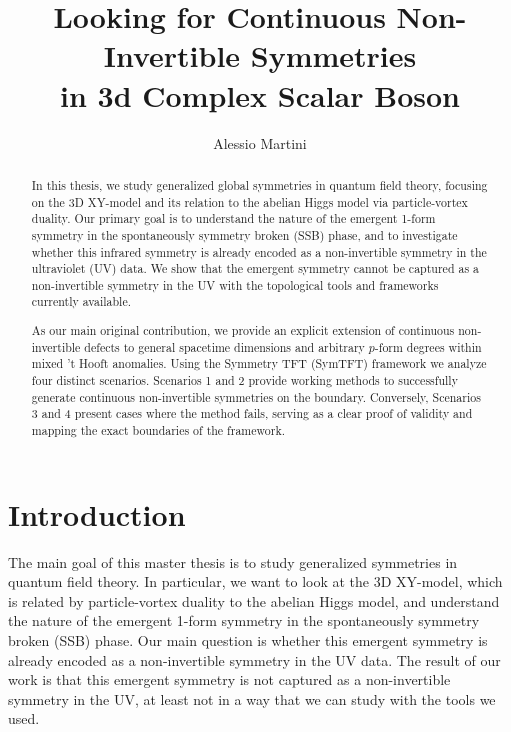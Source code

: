 \documentclass[aps,preprint,nofootinbib,preprintnumbers,eqsecnum,superscriptaddress]{revtex4}
\numberwithin{equation}{section}
\begin{document}
\title{Looking for Continuous Non-Invertible Symmetries\\in 3d Complex Scalar Boson}
\author{Alessio Martini} 

\begin{abstract}
In this thesis, we study generalized global symmetries in quantum field theory, focusing on the 3D XY-model and its relation to the abelian Higgs model via particle-vortex duality. Our primary goal is to understand the nature of the emergent 1-form symmetry in the spontaneously symmetry broken (SSB) phase, and to investigate whether this infrared symmetry is already encoded as a non-invertible symmetry in the ultraviolet (UV) data. We show that the emergent symmetry cannot be captured as a non-invertible symmetry in the UV with the topological tools and frameworks currently available.

As our main original contribution, we provide an explicit extension of continuous non-invertible defects to general spacetime dimensions and arbitrary $p$-form degrees within mixed 't Hooft anomalies. Using the Symmetry TFT (SymTFT) framework we analyze four distinct scenarios. Scenarios 1 and 2 provide working methods to successfully generate continuous non-invertible symmetries on the boundary. Conversely, Scenarios 3 and 4 present cases where the method fails, serving as a clear proof of validity and mapping the exact boundaries of the framework. 
\end{abstract}
\maketitle


\tableofcontents

\newpage

\section{Introduction}
\label{sec:introduction}

The main goal of this master thesis is to study generalized symmetries in quantum field theory. In particular, we want to look at the 3D XY-model, which is related by particle-vortex duality to the abelian Higgs model, and understand the nature of the emergent 1-form symmetry in the spontaneously symmetry broken (SSB) phase. Our main question is whether this emergent symmetry is already encoded as a non-invertible symmetry in the UV data. The result of our work is that this emergent symmetry is not captured as a non-invertible symmetry in the UV, at least not in a way that we can study with the tools we used.
\end{document}
